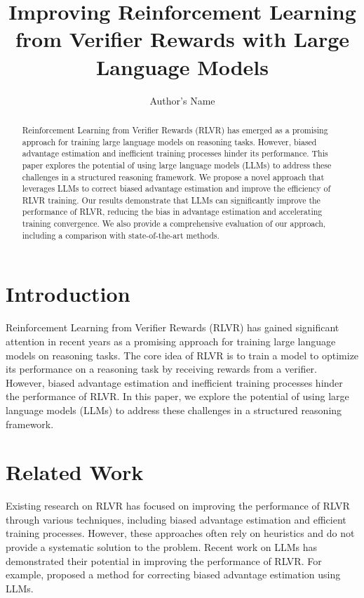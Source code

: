 \documentclass{article}
\begin{document}
\title{Improving Reinforcement Learning from Verifier Rewards with Large Language Models}

\author{Author's Name}

\maketitle

\begin{abstract}
Reinforcement Learning from Verifier Rewards (RLVR) has emerged as a promising approach for training large language models on reasoning tasks. However, biased advantage estimation and inefficient training processes hinder its performance. This paper explores the potential of using large language models (LLMs) to address these challenges in a structured reasoning framework. We propose a novel approach that leverages LLMs to correct biased advantage estimation and improve the efficiency of RLVR training. Our results demonstrate that LLMs can significantly improve the performance of RLVR, reducing the bias in advantage estimation and accelerating training convergence. We also provide a comprehensive evaluation of our approach, including a comparison with state-of-the-art methods.
\end{abstract}

\section{Introduction}

Reinforcement Learning from Verifier Rewards (RLVR) has gained significant attention in recent years as a promising approach for training large language models on reasoning tasks. The core idea of RLVR is to train a model to optimize its performance on a reasoning task by receiving rewards from a verifier. However, biased advantage estimation and inefficient training processes hinder the performance of RLVR. In this paper, we explore the potential of using large language models (LLMs) to address these challenges in a structured reasoning framework.

\section{Related Work}

Existing research on RLVR has focused on improving the performance of RLVR through various techniques, including biased advantage estimation and efficient training processes. However, these approaches often rely on heuristics and do not provide a systematic solution to the problem. Recent work on LLMs has demonstrated their potential in improving the performance of RLVR. For example, \cite{yang2026grouprelativeadvantagebiased} proposed a method for correcting biased advantage estimation using LLMs.
\end{document}
